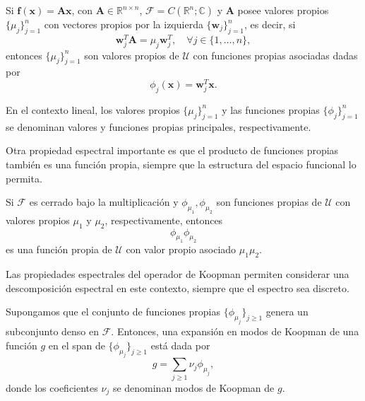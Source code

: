 \begin{prop}
    Si $\mathbf{f}(\mathbf{x}) = \mathbf{A}\mathbf{x}$, con $\mathbf{A} \in \mathbb{R}^{n \times n}$, $\mathcal{F} = C(\mathbb{R}^n; \mathbb{C})$ y $\mathbf{A}$ posee valores propios $\{\mu_j\}_{j=1}^n$ con vectores propios por la izquierda $\{ \mathbf{w}_j \}_{j=1}^n$, es decir, si  
    \begin{equation*}
        \mathbf{w}_j^T \mathbf{A} = \mu_j \mathbf{w}_j^T, \quad \forall j \in \{1, \dots, n\},
    \end{equation*}
    entonces $\{\mu_j\}_{j=1}^n$ son valores propios de $\mathcal{U}$ con funciones propias asociadas dadas por  
    \begin{equation*}
        \phi_j (\mathbf{x}) = \mathbf{w}_j^T \mathbf{x}.
    \end{equation*}
\end{prop}

En el contexto lineal, los valores propios $\{\mu_j\}_{j=1}^n$ y las funciones propias $\{\phi_j\}_{j=1}^n$ se denominan valores y funciones propias principales, respectivamente.  

Otra propiedad espectral importante es que el producto de funciones propias también es una función propia, siempre que la estructura del espacio funcional lo permita.

\begin{prop}
    Si $\mathcal{F}$ es cerrado bajo la multiplicación y $\phi_{\mu_1}, \phi_{\mu_2}$ son funciones propias de $\mathcal{U}$ con valores propios $\mu_1$ y $\mu_2$, respectivamente, entonces  
    \begin{equation*}
        \phi_{\mu_1} \phi_{\mu_2}
    \end{equation*}
    es una función propia de $\mathcal{U}$ con valor propio asociado $\mu_1 \mu_2$.
\end{prop}

Las propiedades espectrales del operador de Koopman permiten considerar una descomposición espectral en este contexto, siempre que el espectro sea discreto.

\begin{defn}
    Supongamos que el conjunto de funciones propias $\{ \phi_{\mu_j} \}_{j \geq 1}$ genera un subconjunto denso en $\mathcal{F}$. Entonces, una expansión en modos de Koopman de una función $g$ en el span de $\{ \phi_{\mu_j} \}_{j \geq 1}$ está dada por  
    \begin{equation*}
        g = \sum_{j \geq 1} \nu_j \phi_{\mu_j},
    \end{equation*}
    donde los coeficientes $\nu_j$ se denominan modos de Koopman de $g$.
\end{defn}

